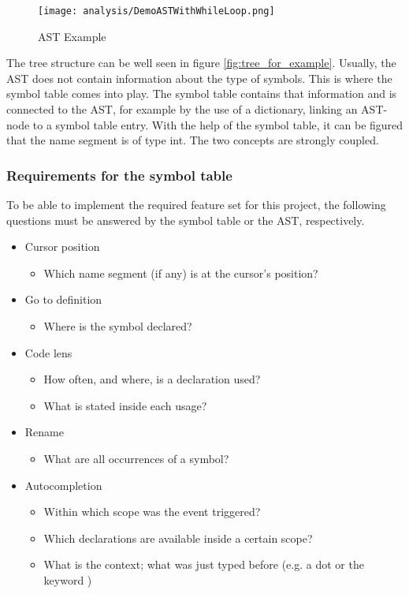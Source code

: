 \begin{figure}[h]
    \centering
    \texttt{[image: analysis/DemoASTWithWhileLoop.png]}
    \caption{AST Example}
    \label{fig:ast_for_example}
\end{figure}

The tree structure can be well seen in figure \ref{fig:tree_for_example}.
Usually, the AST does not contain information about the type of symbols.
This is where the symbol table comes into play.
The symbol table contains that information and is connected to the AST, for example by the use of a dictionary, linking an AST-node to a symbol table entry.
With the help of the symbol table, it can be figured that the name segment  is of type int.
The two concepts are strongly coupled.

\subsubsection{Requirements for the symbol table}
To be able to implement the required feature set for this project, the following questions must be answered by the symbol table or the AST, respectively.
\begin{itemize}
    \item Cursor position
    \begin{itemize}
        \item Which name segment (if any) is at the cursor's position?
    \end{itemize}

    \item Go to definition
        \begin{itemize}
            \item Where is the symbol declared?
        \end{itemize}

    \item Code lens
        \begin{itemize}
            \item How often, and where, is a declaration used?
            \item What is stated inside each usage?
        \end{itemize}

    \item Rename
        \begin{itemize}
            \item What are all occurrences of a symbol?
        \end{itemize}

    \item Autocompletion
        \begin{itemize}
            \item Within which scope was the event triggered?
            \item Which declarations are available inside a certain scope?
            \item What is the context; what was just typed before (e.g. a dot or the keyword )
        \end{itemize}
\end{itemize}


